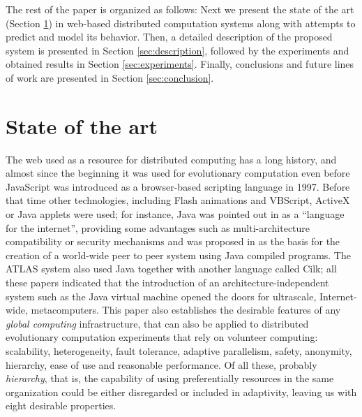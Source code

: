 \documentclass[journal,onecolumn]{IEEEtran}
\begin{document}
The rest of the paper is organized as follows: Next we present the
state of the art (Section \ref{sec:soa}) in web-based distributed
computation systems along with attempts to predict and model its behavior. %
Then, a detailed description of the proposed system is presented
in Section \ref{sec:description}, followed by the experiments and
obtained results in Section \ref{sec:experiments}.
Finally, conclusions and future lines of work are presented in Section
\ref{sec:conclusion}. 

\section{State of the art}
\label{sec:soa}

The web used as a resource for distributed computing has a
long history, and almost since the beginning it was used for
evolutionary computation even before JavaScript was
introduced as a browser-based scripting language in 1997. Before that
time other technologies,
 including Flash animations and VBScript, ActiveX or Java applets were
used; for instance, Java was pointed out in \cite{soares1998get} as a
``language for the
internet'', providing some advantages such as multi-architecture compatibility or
security mechanisms and was proposed in \cite{chandy1996world} as the
basis for the creation of a world-wide peer to peer system using Java
compiled programs. The ATLAS system
\cite{Baldeschwieler:1996:TIG:504450.504482} also used Java together
with another language called Cilk; all these papers indicated that
the introduction of an architecture-independent system such as the
Java virtual machine opened the doors for ultrascale, Internet-wide,
metacomputers. This paper also establishes the desirable features of
any {\em global computing} infrastructure, that can also be applied to
distributed evolutionary computation experiments that rely on
volunteer computing: scalability, heterogeneity, fault tolerance,
adaptive parallelism, safety, anonymity, hierarchy, ease of use and
reasonable performance. Of all these, probably {\em hierarchy}, that
is, the capability of using preferentially resources in the same
organization could be either disregarded or included in adaptivity,
leaving us with eight desirable properties.
\end{document}
